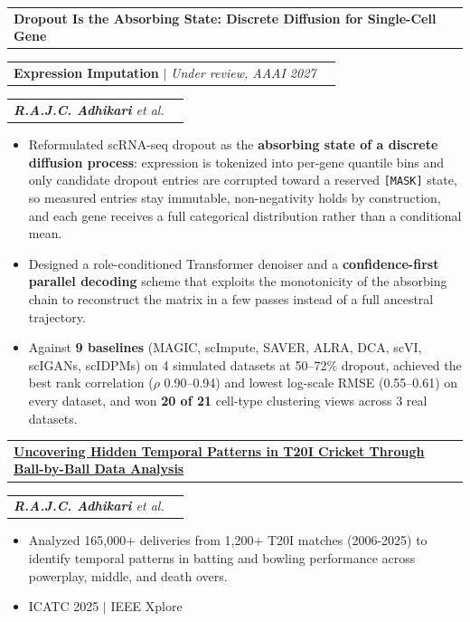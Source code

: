 \documentclass[a4paper,10pt]{article}
\makeatletter
\newcommand{\resumeItem}[1]{
  \item\small{
    {#1 \vspace{-2pt}}
  }
}
\newcommand{\resumeExperienceSubheading}[2]{
    \vspace{-19pt}\item
    \begin{tabularx}{\textwidth}{@{}>{\hsize=1.4\hsize}X>{\hsize=0.6\hsize}X@{}}
      \small#1 & \small #2 \\
    \end{tabularx}\vspace{-7pt}
}
\newcommand{\resumeProjectHeading}[2]{
    \item
    \begin{tabular*}{0.97\textwidth}{l@{\extracolsep{\fill}}r}
      #1 & \footnotesize #2 \\
    \end{tabular*}\vspace{-7pt}
}
\newcommand{\resumeItemListStart}{\begin{itemize}}
\newcommand{\resumeItemListEnd}{\end{itemize}\vspace{-5pt}}
\makeatother
\begin{document}
        \vspace{4pt}
        \resumeProjectHeading
            {\textbf{Dropout Is the Absorbing State: Discrete Diffusion for Single-Cell Gene}}{}
            \vspace{-14pt}
        \resumeProjectHeading
            {\textbf{Expression Imputation} $|$ \emph{\footnotesize Under review, AAAI 2027}}{}
            \vspace{-2pt}
            \resumeExperienceSubheading
                {\emph{\textbf{R.A.J.C. Adhikari} et al.}}{}
            \vspace{-12pt}
            \resumeItemListStart
            \resumeItem{Reformulated scRNA-seq dropout as the \textbf{absorbing state of a discrete diffusion process}: expression is tokenized into per-gene quantile bins and only candidate dropout entries are corrupted toward a reserved \texttt{[MASK]} state, so measured entries stay immutable, non-negativity holds by construction, and each gene receives a full categorical distribution rather than a conditional mean.}
            \resumeItem{Designed a role-conditioned Transformer denoiser and a \textbf{confidence-first parallel decoding} scheme that exploits the monotonicity of the absorbing chain to reconstruct the matrix in a few passes instead of a full ancestral trajectory.}
            \resumeItem{Against \textbf{9 baselines} (MAGIC, scImpute, SAVER, ALRA, DCA, scVI, scIGANs, scIDPMs) on 4 simulated datasets at 50--72\% dropout, achieved the best rank correlation ($\rho$ 0.90--0.94) and lowest log-scale RMSE (0.55--0.61) on every dataset, and won \textbf{20 of 21} cell-type clustering views across 3 real datasets.}
          \resumeItemListEnd

        \vspace{4pt}
        \resumeProjectHeading
            {\textbf{\href{https://doi.org/10.1109/ICATC68823.2025.11407838}{\underline{Uncovering Hidden Temporal Patterns in T20I Cricket Through Ball-by-Ball Data Analysis}}}}{}
            \vspace{-2pt}
            \resumeExperienceSubheading
                {\emph{\textbf{R.A.J.C. Adhikari} et al.}}{}
            \vspace{-12pt}
            \resumeItemListStart
            \resumeItem{Analyzed 165,000+ deliveries from 1,200+ T20I matches (2006-2025) to identify temporal patterns in batting and bowling performance across powerplay, middle, and death overs.}
            \resumeItem{ICATC 2025 $|$ IEEE Xplore}
          \resumeItemListEnd
\end{document}
